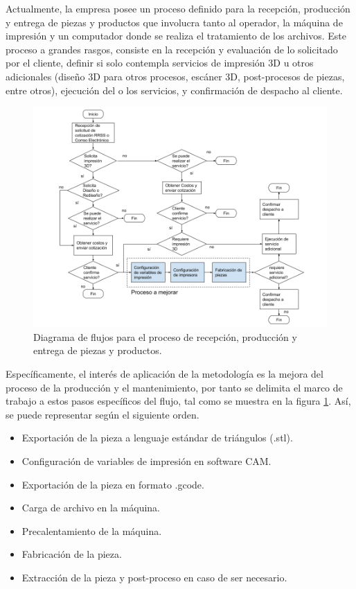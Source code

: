 Actualmente, la empresa posee un proceso definido para la recepción, producción y entrega de piezas y productos que involucra tanto al operador, la máquina de impresión y un computador donde se realiza el tratamiento de los archivos. Este proceso a grandes rasgos, consiste en la recepción y evaluación de lo solicitado por el cliente, definir si solo contempla servicios de impresión 3D u otros adicionales (diseño 3D para otros procesos, escáner 3D, post-procesos de piezas, entre otros), ejecución del o los servicios, y confirmación de despacho al cliente.  

\begin{figure}[H]
\centering
\includegraphics[scale=0.4]{images/procesosdiag.png}
\caption{Diagrama de flujos para el proceso de recepción, producción y entrega de piezas y productos.}
\label{procesosdiag}
\end{figure}


Específicamente, el interés de aplicación de la metodología es la mejora del proceso de la producción y el mantenimiento, por tanto se delimita el marco de trabajo a estos pasos específicos del flujo, tal como se muestra en la figura \ref{procesosdiag}. Así, se puede representar según el siguiente orden.

\begin{itemize}
\item Exportación de la pieza a lenguaje estándar de triángulos (.stl).
\item Configuración de variables de impresión en software CAM.
\item Exportación de la pieza en formato .gcode.
\item Carga de archivo en la máquina.
\item Precalentamiento de la máquina.
\item Fabricación de la pieza.
\item Extracción de la pieza y post-proceso en caso de ser necesario.
\end{itemize}

